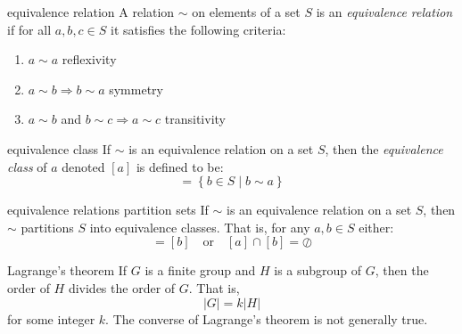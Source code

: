 \documentclass[avery5371,grid]{flashcards}
\begin{document}
\begin{flashcard}[Definition]{equivalence relation}
A relation $\sim$ on elements of a set $S$ is an \textit{equivalence relation}
if for all $a, b, c \in S$ it satisfies the following criteria:
\begin{enumerate}
\item $a \sim a$ reflexivity
\item $a \sim b \Rightarrow b \sim a$ symmetry
\item $a \sim b$ and $b \sim c \Rightarrow a \sim c$ transitivity
\end{enumerate}
\end{flashcard}

\begin{flashcard}[Definition]{equivalence class}
If $\sim$ is an equivalence relation on a set $S$, then the
\textit{equivalence class} of $a$ denoted $[a]$ is defined to be:
\begin{equation*}
[a] = \left\lbrace b \in S \mid b \sim a\right\rbrace 
\end{equation*}
\end{flashcard}

\begin{flashcard}[Theorem]{equivalence relations partition sets}
If $\sim$ is an equivalence relation on a set $S$, then $\sim$ partitions $S$
into equivalence classes.  That is, for any $a, b \in S$ either:
\begin{equation*}
[a] = [b] \quad \textrm{or} \quad [a] \cap [b] = \oslash
\end{equation*}
\end{flashcard}

\begin{flashcard}[Theorem]{Lagrange's theorem}
If $G$ is a finite group and $H$ is a subgroup of $G$, then the order of $H$ divides the order of $G$.  That is,
\begin{equation*}
\left| G \right| = k \left| H \right|
\end{equation*}
for some integer $k$.  The converse of Lagrange's theorem is not generally true.
\end{flashcard}
\end{document}
